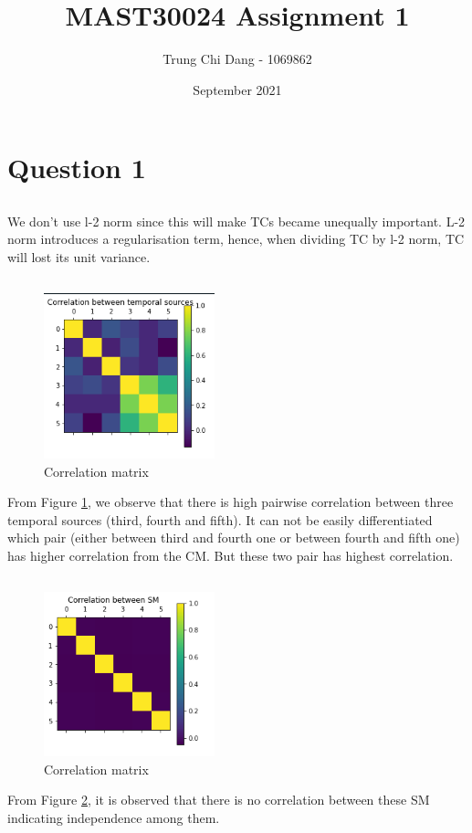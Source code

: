\documentclass{article}
\title{MAST30024 Assignment 1}
\author{Trung Chi Dang - 1069862 }
\date{September 2021}
\begin{document}
\maketitle

\section{Question 1}
\subsection{}
We don't use l-2 norm since this will make TCs became unequally important. L-2 norm introduces a regularisation term, hence, when dividing TC by l-2 norm, TC will lost its unit variance.

\subsection{}
\begin{figure}[H]
    \centering
    \includegraphics[]{corr tc.png}
    \caption{Correlation matrix}
    \label{fig:corr tc}
\end{figure}
From Figure \ref{fig:corr tc}, we observe that there is high pairwise correlation between three temporal sources (third, fourth and fifth). It can not be easily differentiated which pair (either between third and fourth one or between fourth and fifth one) has higher correlation from the CM. But these two pair has highest correlation.

\subsection{}
\begin{figure}[H]
    \centering
    \includegraphics[]{corr tm.png}
    \caption{Correlation matrix}
    \label{fig:corr tm}
\end{figure}
From Figure \ref{fig:corr tm}, it is observed that there is no correlation between these SM indicating independence among them.
\end{document}
